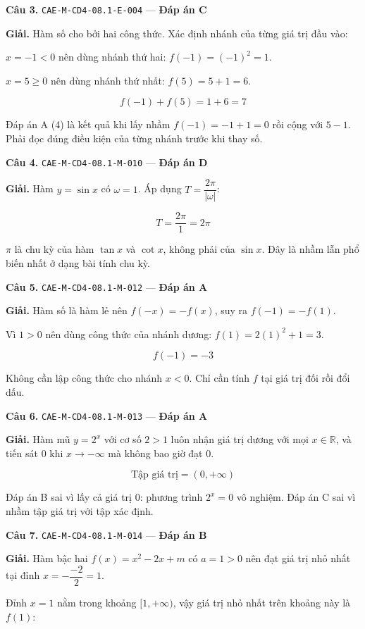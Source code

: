 \documentclass[11pt, a4paper]{article}
\begin{document}
\textbf{Câu 3.} \texttt{CAE-M-CD4-08.1-E-004} — \textbf{Đáp án C}

\textbf{Giải.} Hàm số cho bởi hai công thức. Xác định nhánh của từng giá trị đầu vào:

$x = -1 < 0$ nên dùng nhánh thứ hai: $f(-1) = (-1)^2 = 1$.

$x = 5 \ge 0$ nên dùng nhánh thứ nhất: $f(5) = 5 + 1 = 6$.

$$f(-1) + f(5) = 1 + 6 = 7$$

 Đáp án A (4) là kết quả khi lấy nhầm $f(-1) = -1 + 1 = 0$ rồi cộng với $5 - 1$. Phải đọc đúng điều kiện của từng nhánh trước khi thay số.

\textbf{Câu 4.} \texttt{CAE-M-CD4-08.1-M-010} — \textbf{Đáp án D}

\textbf{Giải.} Hàm $y = \sin x$ có $\omega = 1$. Áp dụng $T = \dfrac{2\pi}{|\omega|}$:

$$T = \frac{2\pi}{1} = 2\pi$$

 $\pi$ là chu kỳ của hàm $\tan x$ và $\cot x$, không phải của $\sin x$. Đây là nhầm lẫn phổ biến nhất ở dạng bài tính chu kỳ.

\textbf{Câu 5.} \texttt{CAE-M-CD4-08.1-M-012} — \textbf{Đáp án A}

\textbf{Giải.} Hàm số là hàm lẻ nên $f(-x) = -f(x)$, suy ra $f(-1) = -f(1)$.

Vì $1 > 0$ nên dùng công thức của nhánh dương: $f(1) = 2(1)^2 + 1 = 3$.

$$f(-1) = -3$$

 Không cần lập công thức cho nhánh $x < 0$. Chỉ cần tính $f$ tại giá trị đối rồi đổi dấu.

\textbf{Câu 6.} \texttt{CAE-M-CD4-08.1-M-013} — \textbf{Đáp án A}

\textbf{Giải.} Hàm mũ $y = 2^x$ với cơ số $2 > 1$ luôn nhận giá trị dương với mọi $x \in \mathbb{R}$, và tiến sát $0$ khi $x \to -\infty$ mà không bao giờ đạt $0$.

$$\text{Tập giá trị} = (0, +\infty)$$

 Đáp án B sai vì lấy cả giá trị $0$: phương trình $2^x = 0$ vô nghiệm. Đáp án C sai vì nhầm tập giá trị với tập xác định.

\textbf{Câu 7.} \texttt{CAE-M-CD4-08.1-M-014} — \textbf{Đáp án B}

\textbf{Giải.} Hàm bậc hai $f(x) = x^2 - 2x + m$ có $a = 1 > 0$ nên đạt giá trị nhỏ nhất tại đỉnh $x = -\dfrac{-2}{2} = 1$.

Đỉnh $x = 1$ nằm trong khoảng $[1, +\infty)$, vậy giá trị nhỏ nhất trên khoảng này là $f(1)$:
\end{document}
